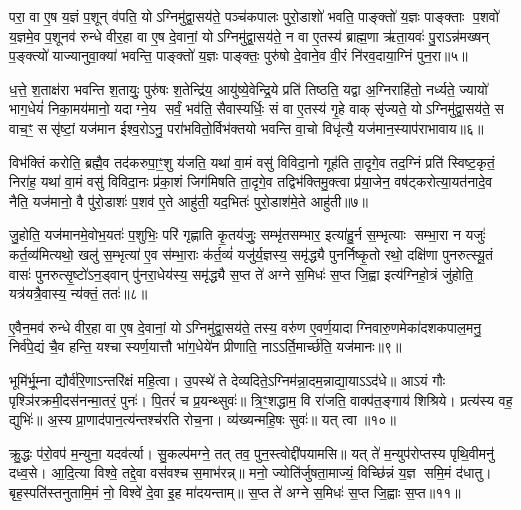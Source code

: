 {\anuvakamend[{अशी॑यत॒ तत् तेन॒ वेद॑ द॒र्भैः पञ्च॑विशतिश्च॥१॥}]}

परा॒ वा ए॒ष य॒ज्ञं प॒शून् व॑पति॒ योऽग्निमु॑द्वा॒सय॑ते॒ पञ्च॑कपालः पुरो॒डाशो॑ भवति॒ पाङ्क्तो॑ य॒ज्ञः पाङ्क्ताः प॒शवो॑ य॒ज्ञमे॒व प॒शूनव॑ रुन्धे वीर॒हा वा ए॒ष दे॒वानां॒ योऽग्निमु॑द्वा॒सय॑ते॒ न वा ए॒तस्य॑ ब्राह्म॒णा ऋ॑ता॒यवः॑ पु॒राऽन्न॑मख्षन् प॒ङ्क्त्यो॑ याज्यानुवा॒क्या॑ भवन्ति॒ पाङ्क्तो॑ य॒ज्ञः पाङ्क्तः॒ पुरु॑षो दे॒वाने॒व वी॒रं नि॑रव॒दाया॒ग्निं पुन॒रा॥५॥

ध॒त्ते॒ श॒ताक्ष॑रा भवन्ति श॒तायुः॒ पुरु॑षः श॒तेन्द्रि॑य॒ आयु॑ष्ये॒वेन्द्रि॒ये प्रति॑ तिष्ठति॒ यद्वा अ॒ग्निराहि॑तो॒ नर्ध्यते॒ ज्यायो॑ भाग॒धेयं॑ निका॒मय॑मानो॒ यदाग्ने॒य सर्वं॒ भव॑ति॒ सैवास्यर्धिः॒ सं वा ए॒तस्य॑ गृ॒हे वाक् सृ॑ज्यते॒ योऽग्निमु॑द्वा॒सय॑ते॒ स वाच॒ꣳ॒ ससृ॑ष्टां॒ यज॑मान ईश्व॒रोऽनु॒ परा॑भवितो॒र्विभ॑क्तयो भवन्ति वा॒चो विधृ॑त्यै॒ यज॑मान॒स्याप॑राभावाय॥६॥

विभ॑क्तिं करोति॒ ब्रह्मै॒व तद॑करुपा॒ꣳ॒शु य॑जति॒ यथा॑ वा॒मं वसु॑ विविदा॒नो गूह॑ति ता॒दृगे॒व तद॒ग्निं प्रति॑ स्विष्ट॒कृतं॒ निरा॑ह॒ यथा॑ वा॒मं वसु॑ विविदा॒नः प्र॑का॒शं जिग॑मिषति ता॒दृगे॒व तद्विभ॑क्तिमु॒क्त्वा प्र॑या॒जेन॒ वष॑ट्करोत्या॒यत॑नादे॒व नैति॒ यज॑मानो॒ वै पु॑रो॒डाशः॑ प॒शव॑ ए॒ते आहु॑ती॒ यद॒भितः॑ पुरो॒डाश॑मे॒ते आहु॑ती॥७॥

जु॒होति॒ यज॑मानमे॒वोभ॒यतः॑ प॒शुभिः॒ परि॑ गृह्णाति कृ॒तय॑जुः॒ सम्भृ॑तसम्भार॒ इत्या॑हु॒र्न स॒म्भृत्याः सम्भा॒रा न यजुः॑ कर्त॒व्य॑मित्यथो॒ खलु॑ स॒म्भृत्या॑ ए॒व स॑म्भा॒राः क॑र्त॒व्यं॑ यजु॑र्य॒ज्ञस्य॒ समृ॑द्ध्यै पुनर्निष्कृ॒तो रथो॒ दक्षि॑णा पुनरुत्स्यू॒तं वासः॑ पुनरुत्सृ॒ष्टो॑ऽन॒ड्वान् पु॑नरा॒धेय॑स्य॒ समृ॑द्ध्यै स॒प्त ते॑ अग्ने स॒मिधः॑ स॒प्त जि॒ह्वा इत्य॑ग्निहो॒त्रं जु॑होति॒ यत्र॑यत्रै॒वास्य॒ न्य॑क्तं॒ ततः॑॥८॥

ए॒वैन॒मव॑ रुन्धे वीर॒हा वा ए॒ष दे॒वानां॒ योऽग्निमु॑द्वा॒सय॑ते॒ तस्य॒ वरु॑ण ए॒वर्ण॒यादाग्निवारु॒णमेका॑दशकपाल॒मनु॒ निर्व॑पे॒द्यं चै॒व हन्ति॒ यश्चास्यर्ण॒यात्तौ भा॑ग॒धेये॑न प्रीणाति॒ नाऽऽर्ति॒मार्च्छ॑ति॒ यज॑मानः॥९॥

{\anuvakamend[{आऽप॑राभावाय पुरो॒डाश॑मे॒ते आहु॑ती॒ तत॒ष्षट्त्रिꣳ॑शच्च॥२॥}]}

भूमि॑र्भू॒म्ना द्यौर्व॑रि॒णाऽन्तरि॑क्षं महि॒त्वा। उ॒पस्थे॑ ते देव्यदिते॒ऽग्निम॑न्ना॒दम॒न्नाद्या॒याऽऽद॑धे॥ आऽयं गौः पृश्ञि॑रक्रमी॒दस॑नन्मा॒तरं॒ पुनः॑। पि॒तरं॑ च प्र॒यन्थ्सुवः॑॥ त्रि॒ꣳ॒शद्धाम॒ वि रा॑जति॒ वाक्प॑त॒ङ्गाय॑ शिश्रिये। प्रत्य॑स्य वह॒ द्युभिः॑॥ अ॒स्य प्रा॒णाद॑पान॒त्य॑न्तश्च॑रति रोच॒ना। व्य॑ख्यन्महि॒षः सुवः॑॥ यत् त्वा॥१०॥

क्रु॒द्धः प॑रो॒वप॑ म॒न्युना॒ यदव॑र्त्या। सु॒कल्प॑मग्ने॒ तत् तव॒ पुन॒स्त्वोद्दी॑पयामसि॥ यत् ते॑ म॒न्युप॑रोप्तस्य पृथि॒वीमनु॑ दध्व॒से। आ॒दि॒त्या विश्वे॒ तद्दे॒वा वस॑वश्च स॒माभ॑रन्न्॥ मनो॒ ज्योति॑र्जुषता॒माज्यं॒ विच्छि॑न्नं य॒ज्ञ समि॒मं द॑धातु। बृह॒स्पति॑स्तनुतामि॒मं नो॒ विश्वे॑ दे॒वा इ॒ह मा॑दयन्ताम्॥ स॒प्त ते॑ अग्ने स॒मिधः॑ स॒प्त जि॒ह्वाः स॒प्त॥११॥

